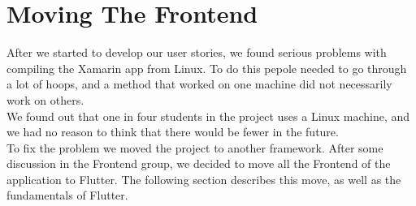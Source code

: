 \section{Moving The Frontend}\label{sec:MovingTheFrontend}

After we started to develop our user stories, we found serious problems with compiling the Xamarin app from Linux. To do this pepole needed to go through a lot of hoops, and a method that worked on one machine did not necessarily work on others.\\
We found out that one in four students in the project uses a Linux machine, and we had no reason to think that there would be fewer in the future.\\
To fix the problem we moved the project to another framework. After some discussion in the Frontend group, we decided to move all the Frontend of the application to Flutter. The following section describes this move, as well as the fundamentals of Flutter. 



